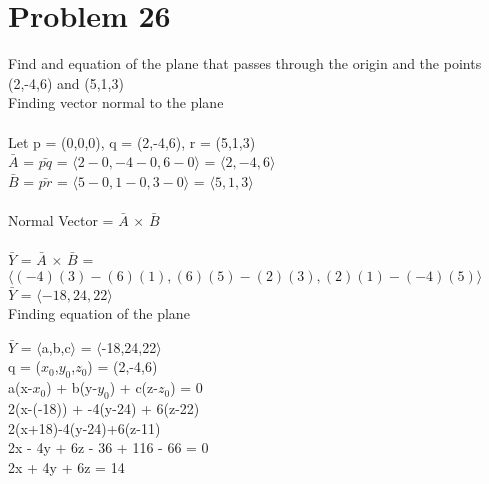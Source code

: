 \documentclass{article} %
\begin{document}
    \section*{Problem 26} %
    Find and equation of the plane that passes through the origin and the points (2,-4,6) and (5,1,3)
    \vspace{0.5in}\\
    Finding vector normal to the plane\\\\
    Let p = (0,0,0), q = (2,-4,6), r = (5,1,3)\\
    $\bar{A}$ = $\bar{pq}$ = $\langle2-0,-4-0,6-0\rangle$ = $\langle2,-4,6\rangle$\\
    $\bar{B}$ = $\bar{pr}$ = $\langle5-0,1-0,3-0\rangle$ = $\langle5,1,3\rangle$\\\\
    Normal Vector = $\bar{A}$ $\times$ $\bar{B}$\\\\
    $\bar{Y}$ = $\bar{A}$ $\times$ $\bar{B}$ = $\langle(-4)(3) - (6)(1), (6)(5) - (2)(3), (2)(1) - (-4)(5)\rangle$\\
    $\bar{Y}$ = $\langle-18,24,22\rangle$\\

    Finding equation of the plane
    \begin{center}
        $\bar{Y}$ = $\langle$a,b,c$\rangle$ = $\langle$-18,24,22$\rangle$\\
        \vspace{0.1cm}q = ($x_0$,$y_0$,$z_0$) = (2,-4,6)\\
        \vspace{0.1cm}a(x-$x_0$) + b(y-$y_0$) + c(z-$z_0$) = 0\\
        \vspace{0.1cm}2(x-(-18)) + -4(y-24) + 6(z-22)\\
        \vspace{0.1cm}2(x+18)-4(y-24)+6(z-11)\\
        \vspace{0.1cm}2x - 4y + 6z - 36 + 116 - 66 = 0\\
        \vspace{0.1cm}2x + 4y + 6z = 14\\
    \end{center}
    
\end{document}
